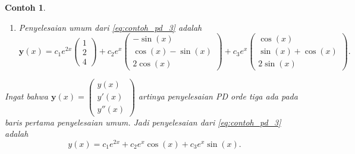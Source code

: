 \documentclass[a4paper]{article}
\theoremstyle{definisi}
\newtheorem{contoh}{Contoh}[section]
\numberwithin{equation}{section}
\begin{document}
\begin{contoh}
\begin{enumerate}[label=Langkah \arabic*: ,leftmargin=*]
\begin{align*}
      \end{align*}
      \item Penyelesaian umum dari \eqref{eq:contoh_pd_3} adalah
      \[\mathbf{y}(x) = c_1e^{2x}\begin{pmatrix}1\\2\\4\end{pmatrix} + c_2e^x\begin{pmatrix}-\sin(x)\\\cos(x)-\sin(x)\\2\cos(x)\end{pmatrix} + c_3e^x\begin{pmatrix}\cos(x)\\\sin(x)+\cos(x)\\2\sin(x)\end{pmatrix}.\]
    \end{enumerate}
    Ingat bahwa $\mathbf{y}(x)=\begin{pmatrix}y(x)\\y'(x)\\y''(x)\end{pmatrix}$ artinya penyelesaian PD orde tiga ada pada baris pertama penyelesaian umum. Jadi penyelesaian dari \eqref{eq:contoh_pd_3} adalah
    \[y(x) = c_1e^{2x} + c_2e^x\cos(x) + c_3e^x\sin(x).\] 
  \end{contoh}
\end{document}
